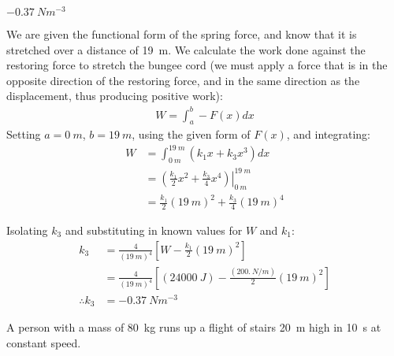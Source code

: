 \begin{finalanswer}
$\SI{-0.37}{N m^{-3}}$
\end{finalanswer}
\begin{solution}
We are given the functional form of the spring force, and know that it is stretched over a distance of \SI{19}{m}. We calculate the work done against the restoring force to stretch the bungee cord (we must apply a force that is in the opposite direction of the restoring force, and in the same direction as the displacement, thus producing positive work):
\begin{align*}
 W = \int_a^b -F(x) dx
\end{align*}
Setting $a=\SI{0}{m}$, $b=\SI{19}{m}$, using the given form of $F(x)$, and integrating:
\begin{align*}
W &= \int_{\SI{0}{m}}^{\SI{19}{m}} \left(k_1 x + k_3 x^3 \right) dx \\
&= \left. \left(\frac{k_1}{2} x^2 + \frac{k_3}{4} x^4 \right) \right|_{\SI{0}{m}}^{\SI{19}{m}} \\
&=  \frac{k_1}{2} (\SI{19}{m})^2 + \frac{k_3}{4} (\SI{19}{m})^4  
\end{align*}

Isolating $k_3$ and substituting in known values for $W$ and $k_1$:
\begin{align*}
k_3 &= \frac{4}{(\SI{19}{m})^4} \left[ W - \frac{k_1}{2} (\SI{19}{m})^2  \right] \\
&= \frac{4}{(\SI{19}{m})^4} \left[ (\SI{24000}{J}) - \frac{(\SI{200.}{N/m})}{2} (\SI{19}{m})^2 \right] \\
\therefore k_3 &= \SI{-0.37}{N m^{-3}}
\end{align*}
\end{solution}

\question A person with a mass of \SI{80}{kg} runs up a flight of stairs \SI{20}{m} high in \SI{10}{s} at constant speed. 

